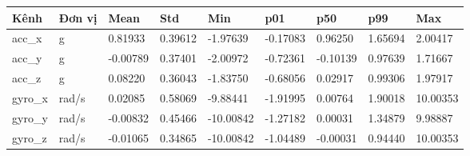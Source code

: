 \begin{tabular}{lllllllll}
\toprule
Kênh & Đơn vị & Mean & Std & Min & p01 & p50 & p99 & Max \\
\midrule
acc\_x & g & 0.81933 & 0.39612 & -1.97639 & -0.17083 & 0.96250 & 1.65694 & 2.00417 \\
acc\_y & g & -0.00789 & 0.37401 & -2.00972 & -0.72361 & -0.10139 & 0.97639 & 1.71667 \\
acc\_z & g & 0.08220 & 0.36043 & -1.83750 & -0.68056 & 0.02917 & 0.99306 & 1.97917 \\
gyro\_x & rad/s & 0.02085 & 0.58069 & -9.88441 & -1.91995 & 0.00764 & 1.90018 & 10.00353 \\
gyro\_y & rad/s & -0.00832 & 0.45466 & -10.00842 & -1.27182 & 0.00031 & 1.34879 & 9.98887 \\
gyro\_z & rad/s & -0.01065 & 0.34865 & -10.00842 & -1.04489 & -0.00031 & 0.94440 & 10.00353 \\
\bottomrule
\end{tabular}
